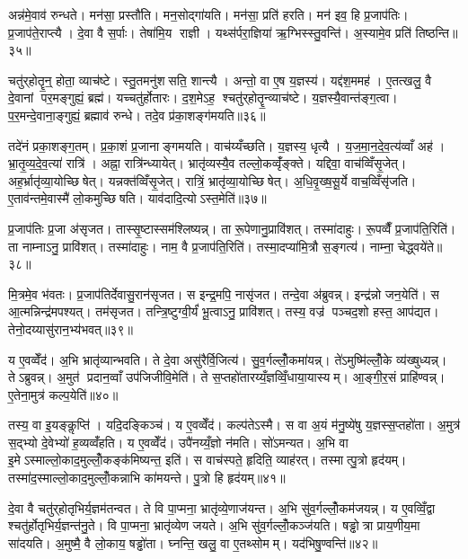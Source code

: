 अन्न॑मे॒वाव॑ रुन्धते। मन॑सा॒ प्रस्तौ॑ति। मन॒सोद्गा॑यति। मन॑सा॒ प्रति॑ हरति। मन॑ इव॒ हि प्र॒जाप॑तिः। प्र॒जाप॑ते॒राप्त्यै। दे॒वा वै स॒र्पाः। तेषा॑मि॒य राज्ञी। यथ्स॑र्परा॒ज्ञिया॑ ऋ॒ग्भिस्स्तु॒वन्ति॑। अ॒स्यामे॒व प्रति॑ तिष्ठन्ति॥३५॥

चतु॑र्‌होतॄ॒न्॒ होता॒ व्याच॑ष्टे। स्तु॒तमनु॑शसति॒ शान्त्यै। अन्तो॒ वा ए॒ष य॒ज्ञस्य॑। यद्द॑श॒ममह॑। ए॒तत्खलु॒ वै दे॒वानां पर॒मङ्गुह्यं॒ ब्रह्म॑। यच्चतु॑र्होतारः। द॒श॒मेऽह॒ श्चतु॑र्‌होतॄ॒न्व्याच॑ष्टे। य॒ज्ञस्यै॒वान्त॑ङ्ग॒त्वा। प॒र॒मन्दे॒वाना॒ङ्गुह्यं॒ ब्रह्माव॑ रुन्धे। तदे॒व प्र॑का॒शङ्ग॑मयति॥३६॥

तदे॑नं प्रका॒शङ्ग॒तम्। प्र॒का॒शं प्र॒जानाङ्गमयति। वाच॑य्यँच्छति। य॒ज्ञस्य॒ धृत्यै। य॒ज॒मा॒न॒दे॒व॒त्य॑व्वाँ अह॑। भ्रा॒तृ॒व्य॒दे॒व॒त्या॑ रात्रि॑। अह्ना॒ रात्रि॑न्ध्यायेत्। भ्रातृ॑व्यस्यै॒व तल्लो॒कव्वृँ॑ङ्क्ते। यद्दिवा॒ वाच॑व्विँसृ॒जेत्। अह॒र्भ्रातृ॑व्या॒योच्छिषेत्। यन्नक्त॑व्विँसृ॒जेत्। रात्रिं॒ भ्रातृ॑व्या॒योच्छिषेत्। अ॒धि॒वृ॒ख्ष॒सू॒र्ये वाच॒व्विँसृ॑जति। ए॒ताव॑न्तमे॒वास्मै॑ लो॒कमुच्छिषति। याव॑दादि॒त्योऽस्त॒मेति॑॥३७॥\anuvakamend[पृश्ञि॑ तिष्ठन्ति गमयति शिषे॒त्पञ्च॑ च]

प्र॒जाप॑तिः प्र॒जा अ॑सृजत। तास्सृ॒ष्टास्सम॑श्लिष्यन्न्। ता रू॒पेणानु॒प्रावि॑शत्। तस्मा॑दाहुः। रू॒पव्वैँ प्र॒जाप॑ति॒रिति॑। ता नाम्नाऽनु॒ प्रावि॑शत्। तस्मा॑दाहुः। नाम॒ वै प्र॒जाप॑ति॒रिति॑। तस्मा॒दप्या॑मि॒त्रौ स॒ङ्गत्य॑। नाम्ना॒ चेद्ध्वये॑ते॥३८॥

मि॒त्रमे॒व भ॑वतः। प्र॒जाप॑तिर्देवासु॒रान॑सृजत। स इन्द्र॒मपि॒ नासृ॑जत। तन्दे॒वा अ॑ब्रुवन्न्। इन्द्र॑न्नो जन॒येति॑। स आ॒त्मन्निन्द्र॑मपश्यत्। तम॑सृजत। तन्त्रि॒ष्टुग्वी॒र्यं॑ भू॒त्वाऽनु॒ प्रावि॑शत्। तस्य॒ वज्र॑ पञ्चद॒शो हस्त॒ आप॑द्यत। तेनो॒दय्यासु॑रान॒भ्य॑भवत्॥३९॥

य ए॒वव्वेँद॑। अ॒भि भ्रातृ॑व्यान्भवति। ते दे॒वा असु॑रैर्वि॒जित्य॑। सु॒व॒र्गल्लोँ॒कमा॑यन्न्। ते॑ऽमुष्मि॑ल्लोँ॒के व्य॑ख्षुध्यन्न्। तेऽब्रुवन्न्। अ॒मुत॑ प्रदान॒व्वाँ उप॑जिजीवि॒मेति॑। ते स॒प्तहो॑तारय्यँ॒ज्ञव्विँ॒धाया॒यास्यम्। आ॒ङ्गी॒र॒सं प्राहि॑ण्वन्न्। ए॒तेना॒मुत्र॑ कल्प॒येति॑॥४०॥

तस्य॒ वा इ॒यङ्कॢप्ति॑। यदि॒दङ्किञ्च॑। य ए॒वव्वेँद॑। कल्प॑तेऽस्मै। स वा अ॒यं म॑नु॒ष्ये॑षु य॒ज्ञस्स॒प्तहो॑ता। अ॒मुत्र॑ स॒द्भ्यो दे॒वेभ्यो॑ ह॒व्यव्वँ॑हति। य ए॒वव्वेँद॑। उपै॑नय्यँ॒ज्ञो न॑मति। सो॑ऽमन्यत। अ॒भि वा इ॒मेऽस्माल्लो॒काद॒मुल्लोँ॒कङ्क॑मिष्यन्त॒ इति॑। स वाच॑स्पते॒ हृदिति॒ व्याह॑रत्। तस्मात्पु॒त्रो हृद॑यम्। तस्मा॑द॒स्माल्लो॒काद॒मुल्लोँ॒कन्नाभि का॑मयन्ते। पु॒त्रो हि हृद॑यम्॥४१॥\anuvakamend[ह्वये॑ते अभवत्कल्प॒येतीति॑ च॒त्वारि॑ च]

दे॒वा वै चतु॑र्‌होतृभिर्य॒ज्ञम॑तन्वत। ते वि पा॒प्मना॒ भ्रातृ॑व्ये॒णाज॑यन्त। अ॒भि सु॑व॒र्गल्लोँ॒कम॑जयन्न्। य ए॒वव्विँ॒द्वा श्चतु॑र्होतृभिर्य॒ज्ञन्त॑नु॒ते। वि पा॒प्मना॒ भ्रातृ॑व्येण जयते। अ॒भि सु॑व॒र्गल्लोँ॒कञ्ज॑यति। षड्ढोत्रा प्राय॒णीय॒मा सा॑दयति। अ॒मुष्मै॒ वै लो॒काय॒ षड्ढो॑ता। घ्नन्ति॒ खलु॒ वा ए॒तथ्सोमम्। यद॑भिषु॒ण्वन्ति॑॥४२॥


